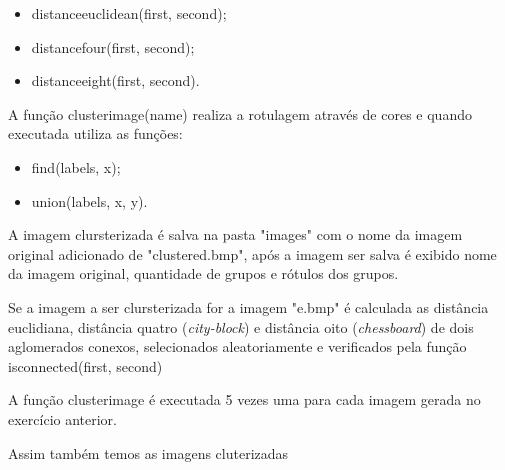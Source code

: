 \documentclass[10pt,a4paper]{article}
\begin{document}
\begin{itemize}
    \item {\ttfamily distance\textunderscore euclidean(first, second)};
    \item {\ttfamily distance\textunderscore four(first, second)};
    \item {\ttfamily distance\textunderscore eight(first, second)}.
\end{itemize}

\begin{flushleft}
A função {\ttfamily cluster\textunderscore image(name)} realiza a rotulagem através de cores e quando executada utiliza as funções:
\end{flushleft}

\begin{itemize}
   \item {\ttfamily find(labels, x)};
   \item {\ttfamily union(labels, x, y)}.
 \end{itemize}

\begin{flushleft}
A imagem clursterizada é salva na pasta "images" com o nome da imagem original adicionado de "\textunderscore clustered.bmp", após a imagem ser salva é exibido nome da imagem original, quantidade de grupos e rótulos dos grupos. 
\end{flushleft}

\begin{flushleft}
Se a imagem a ser clursterizada for a imagem "e.bmp" é calculada as distância euclidiana, distância quatro (\textit{city-block}) e distância oito (\textit{chessboard}) de dois aglomerados conexos, selecionados aleatoriamente e verificados pela função {\ttfamily is\textunderscore connected(first, second)}
\end{flushleft}

\begin{flushleft}
A função {\ttfamily cluster\textunderscore image} é executada 5 vezes uma para cada imagem gerada no exercício anterior.
\end{flushleft}



\begin{flushleft}
Assim também temos as imagens cluterizadas
\end{flushleft}
\end{document}
